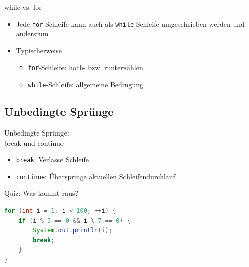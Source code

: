 \documentclass[18pt]{beamer}
\begin{document}
\begin{frame}{while vs. for}
    \begin{itemize}
        \item Jede \texttt{for}-Schleife kann auch als \texttt{while}-Schleife umgeschrieben werden und andersrum
        \pause
        \pause
        \vspace{.3in}
        \item Typischerweise
        \begin{itemize}
            \item \texttt{for}-Schleife: hoch- bzw. runterzählen
            \item \texttt{while}-Schleife: allgemeine Bedingung
        \end{itemize}
    \end{itemize}
\end{frame}

\subsection{Unbedingte Sprünge}

\begin{frame}[fragile]{Unbedingte Sprünge:\\ break und continue}
    \begin{block}{}
        \begin{itemize}
            \item \texttt{break}: Verlasse Schleife
            \item \texttt{continue}: Überspringe aktuellen Schleifendurchlauf
        \end{itemize}
    \end{block}
\end{frame}

\begin{frame}[fragile]{Quiz: Was kommt raus?}
    \begin{exampleblock}{}
        \begin{lstlisting}[language=Java]
for (int i = 1; i < 100; ++i) {
    if (i % 3 == 0 && i % 7 == 0) {
        System.out.println(i);
        break;
    }
}
        \end{lstlisting}
    \end{exampleblock}
\end{frame}
\end{document}
